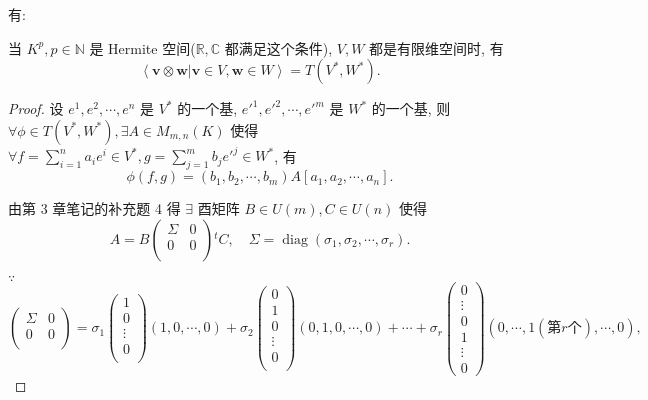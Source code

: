 \documentclass{ctexart}
\begin{document}
有:
\begin{theorem}\label{t1.4}
    当 $K^p,p\in\mathbb{N}$ 是 Hermite 空间($\mathbb{R},\mathbb{C}$ 都满足这个条件), $V,W$ 都是有限维空间时, 有
    \[\left<\boldsymbol{v}\otimes\boldsymbol{w}|\boldsymbol{v}\in V,\boldsymbol{w}\in W\right>=T(V^*,W^*).\]
\end{theorem}
\begin{proof}
    设 $e^1,e^2,\cdots,e^n$ 是 $V^*$ 的一个基, $e'^1,e'^2,\cdots,e'^m$ 是 $W^*$ 的一个基, 则 $\forall \phi\in T(V^*,W^*),\exists A\in M_{m,n}(K)$ 使得 $\forall f=\sum\limits_{i=1}^na_ie^i\in V^*,g=\sum\limits_{j=1}^mb_je'^j\in W^*$, 有
    \[\phi(f,g)=(b_1,b_2,\cdots,b_m)A[a_1,a_2,\cdots,a_n].\]

    由第 3 章笔记的补充题 4 得 $\exists$ 酉矩阵 $B\in U(m),C\in U(n)$ 使得
    \[A=B\begin{pmatrix}
        \Sigma & 0 \\
        0 & 0 \\
    \end{pmatrix}{}^tC,\quad\Sigma=\operatorname{diag}(\sigma_1,\sigma_2,\cdots,\sigma_r).\]
    
    $\because$
    \[\begin{pmatrix}
        \Sigma & 0 \\
        0 & 0 \\
    \end{pmatrix}=\sigma_1\begin{pmatrix}
        1 \\
        0 \\
        \vdots \\
        0 \\
    \end{pmatrix}(1,0,\cdots,0)+\sigma_2\begin{pmatrix}
        0 \\
        1 \\
        0 \\
        \vdots \\
        0 \\
    \end{pmatrix}(0,1,0,\cdots,0)+\cdots+\sigma_r\begin{pmatrix}
        0 \\
        \vdots \\
        0 \\
        1 \\
        \vdots \\
        0
    \end{pmatrix}(0,\cdots,1(\text{第}r\text{个}),\cdots,0),\]


\end{proof}
\end{document}

